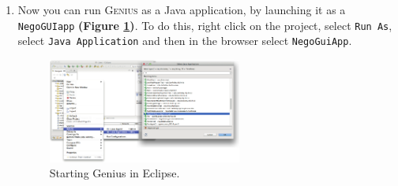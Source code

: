 \documentclass[]{article}
\begin{document}
\begin{enumerate}
    
\item Now you can run G\textsc{enius} as a Java application, by launching it as a \texttt{NegoGUIapp} \textbf{(Figure \ref{fig:startgenius})}. To do this, right click on the project, select \texttt{Run As}, select \texttt{Java Application} and then in the browser select \texttt{NegoGuiApp}.

\begin{figure}[h!]
	\centering
		\includegraphics[width=0.6\textwidth]{media/startup.pdf}
		\caption{Starting Genius in Eclipse.}
	\label{fig:startgenius}
\end{figure}
\end{enumerate}





\end{document}
